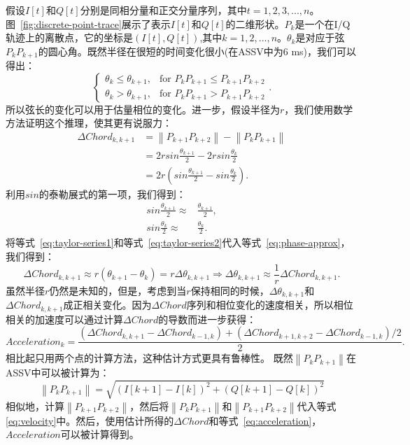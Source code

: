 假设$I[t]$和$Q[t]$分别是同相分量和正交分量序列，其中$t=1,2,3,...,n$。图~\ref{fig:discrete-point-trace}展示了表示$I[t]$和$Q[t]$的二维形状。$P_k$是一个在I/Q轨迹上的离散点，它的坐标是$(I[t],Q[t])$,其中$k=1,2,...,n$。$\theta_{k}$是对应于弦$P_{k}P_{k+1}$的圆心角。既然半径在很短的时间变化很小(在ASSV中为6 ms)，我们可以得出：
$$
\begin{cases} 
  \theta_{k} \leq \theta_{k+1}, & \text{for } P_{k}P_{k+1} \leq P_{k+1}P_{k+2}  \\
  \theta_{k} > \theta_{k+1},  & \text{for } P_{k}P_{k+1} > P_{k+1}P_{k+2}
\end{cases}
.
$$
所以弦长的变化可以用于估量相位的变化。进一步，假设半径为$r$，我们使用数学方法证明这个推理，使其更有说服力：
\begin{align}
\Delta Chord_{k,k+1} &= \left\|P_{k+1}P_{k+2}\right\| - \left\|P_{k}P_{k+1}\right\|  \\ \label{eq:phase-approx}
&= 2rsin\frac{\theta_{k+1}}{2} - 2rsin\frac{\theta_{k}}{2} \nonumber \\  
&= 2r\left(sin\frac{\theta_{k+1}}{2} - sin\frac{\theta_{k}}{2}\right)  
.
\end{align}
利用$sin$的泰勒展式的第一项，我们得到：
\begin{align}
   sin\frac{\theta_{k+1}}{2} \approx & \frac{\theta_{k+1}}{2} ,\label{eq:taylor-series1}\\ 
    sin\frac{\theta_{k}}{2} \approx & \frac{\theta_{k}}{2}. \label{eq:taylor-series2}
\end{align}
将等式~\eqref{eq:taylor-series1}和等式~\eqref{eq:taylor-series2}代入等式~\eqref{eq:phase-approx}，我们得到：
\begin{equation}
 \Delta Chord_{k,k+1} \approx r(\theta_{k+1} - \theta_{k})=r\Delta \theta_{k,k+1} \Rightarrow \Delta \theta_{k,k+1} \approx \frac{1}{r}\Delta Chord_{k,k+1}.  \label{eq:velocity}
\end{equation}
虽然半径$r$仍然是未知的，但是，考虑到当$r$保持相同的时候，$\Delta \theta_{k,k+1}$和$\Delta Chord_{k,k+1}$成正相关变化。因为$\Delta Chord$序列和相位变化的速度相关，所以相位相关的加速度可以通过计算$\Delta Chord$的导数而进一步获得：
\begin{equation}
Acceleration_{k} = \frac{\left( \Delta Chord_{k,k+1} - \Delta Chord_{k-1,k} \right) + \left( \Delta Chord_{k+1,k+2}- \Delta Chord_{k-1,k}\right)/2}{2}. \label{eq:acceleration}
\end{equation}
相比起只用两个点的计算方法，这种估计方式更具有鲁棒性。
既然$\left\|P_{k}P_{k+1}\right\|$在ASSV中可以被计算为：
\begin{equation}
  \left\|P_{k}P_{k+1}\right\|= \sqrt{\left( I[k+1] - I[k] \right)^2 + \left( Q[k+1] - Q[k] \right)^2}
\end{equation}
相似地，计算$\left\|P_{k+1}P_{k+2}\right\|$，然后将$\left\|P_{k}P_{k+1}\right\|$和$\left\|P_{k+1}P_{k+2}\right\|$代入等式\eqref{eq:velocity}中。然后，使用估计所得的$\Delta Chord $和等式~\eqref{eq:acceleration}，$Acceleration$可以被计算得到。



